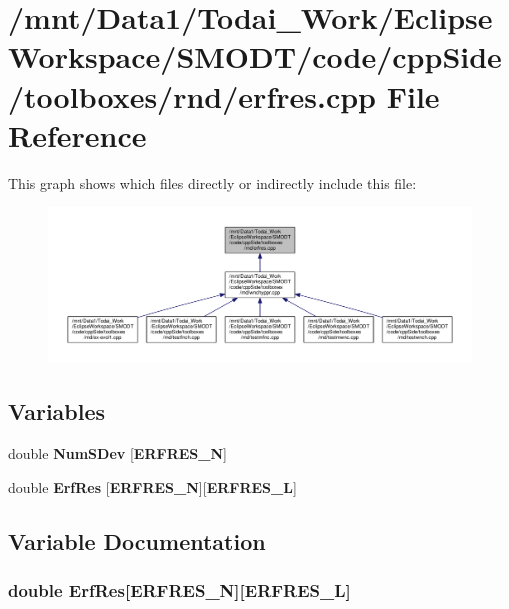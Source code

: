 \section{/mnt/\-Data1/\-Todai\-\_\-\-Work/\-Eclipse\-Workspace/\-S\-M\-O\-D\-T/code/cpp\-Side/toolboxes/rnd/erfres.cpp File Reference}
\label{toolboxes_2rnd_2erfres_8cpp}
This graph shows which files directly or indirectly include this file\-:
\nopagebreak
\begin{figure}[H]
\begin{center}
\leavevmode
\includegraphics[width=350pt]{toolboxes_2rnd_2erfres_8cpp__dep__incl}
\end{center}
\end{figure}
\subsection*{Variables}
\begin{DoxyCompactItemize}
\item 
double {\bf Num\-S\-Dev} [{\bf E\-R\-F\-R\-E\-S\-\_\-\-N}]
\item 
double {\bf Erf\-Res} [{\bf E\-R\-F\-R\-E\-S\-\_\-\-N}][{\bf E\-R\-F\-R\-E\-S\-\_\-\-L}]
\end{DoxyCompactItemize}


\subsection{Variable Documentation}
\subsubsection[{Erf\-Res}]{\setlength{\rightskip}{0pt plus 5cm}double Erf\-Res[{\bf E\-R\-F\-R\-E\-S\-\_\-\-N}][{\bf E\-R\-F\-R\-E\-S\-\_\-\-L}]}\label{toolboxes_2rnd_2erfres_8cpp_a532e3be570cd6f91d0e35bf278570579}


